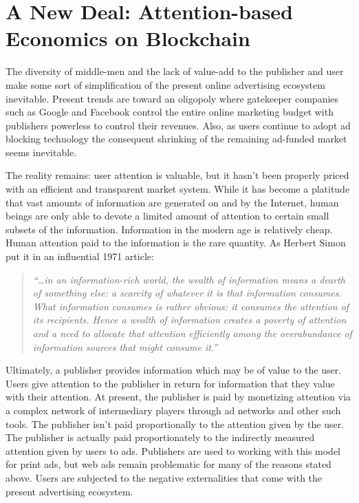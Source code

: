 \documentclass[11pt]{article}
\begin{document}
\section{A New Deal: Attention-based Economics on Blockchain}
\label{sec-4}

The diversity of middle-men and the lack of value-add to the publisher and user make some sort of simplification of the present online advertising ecosystem inevitable. Present trends are toward an oligopoly where gatekeeper companies such as Google and Facebook control the entire online marketing budget with publishers powerless to control their revenues. Also, as users continue to adopt ad blocking technology the consequent shrinking of the remaining ad-funded market seems inevitable. 

The reality remains: user attention is valuable, but it hasn’t been properly priced with an efficient and transparent market system. While it has become a platitude that vast amounts of information are generated on and by the Internet, human beings are only able to devote a limited amount of attention to certain small subsets of the information. Information in the modern age is relatively cheap. Human attention paid to the information is the rare quantity. As Herbert Simon put it in an influential 1971 article:

\begin{quote}
\textit{``\ldots{}in an information-rich world, the wealth of information means a dearth of something else: a scarcity of whatever it is that information consumes. What information consumes is rather obvious: it consumes the attention of its recipients. Hence a wealth of information creates a poverty of attention and a need to allocate that attention efficiently among the overabundance of information sources that might consume it.''}
\end{quote}

Ultimately, a publisher provides information which may be of value to the user. Users give attention to the publisher in return for information that they value with their attention. At present, the publisher is paid by monetizing attention via a complex network of intermediary players through ad networks and other such tools. The publisher isn't paid proportionally to the attention given by the user. The publisher is actually paid proportionately to the indirectly measured attention given by users to ads. Publishers are used to working with this model for print ads, but web ads remain problematic for many of the reasons stated above. Users are subjected to the negative externalities that come with the present advertising ecosystem.
\end{document}
